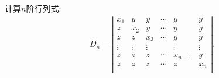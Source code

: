 \documentclass[lang=cn,newtx,10pt,scheme=chinese]{elegantbook}
\begin{document}
\begin{exercise}
计算$n$阶行列式:
\begin{align}
D_n=\left| \begin{matrix}
            x_1&		y&		y&		\cdots&		y&		y\\
            z&		x_2&		y&		\cdots&		y&		y\\
            z&		z&		x_3&		\cdots&		y&		y\\
            \vdots&		\vdots&		\vdots&		&		\vdots&		\vdots\\
            z&		z&		z&		\cdots&		x_{n-1}&		y\\
            z&		z&		z&		\cdots&		z&		x_n\\
        \end{matrix} \right|.
        \nonumber
    \end{align}
\end{exercise}
\end{document}

